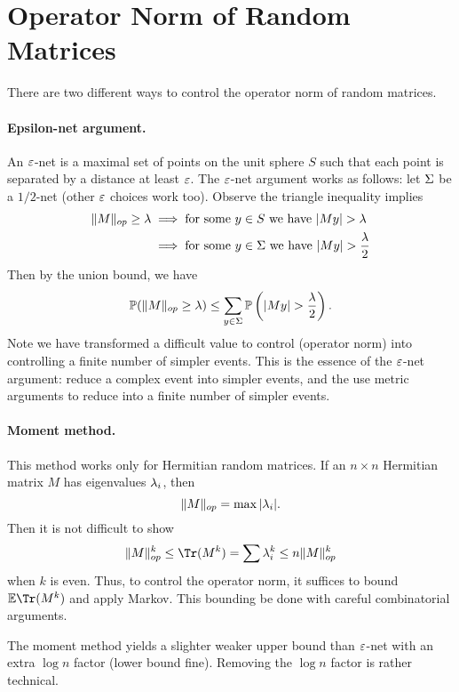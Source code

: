 \section*{Operator Norm of Random Matrices}

There are two different ways to control the operator norm of random matrices.

\paragraph{Epsilon-net argument.} An $\e$-net is a maximal set of points on the unit sphere $S$ such that each point is separated by a distance at least $\e$. The $\e$-net argument works as follows: let $\S$ be a $1/2$-net (other $\e$ choices work too). Observe the triangle inequality implies
\[
    \begin{split}
        \|M\|_{op} \ge \l & \implies \text{for some $y \in S$ we have } |My| > \l            \\
                          & \implies \text{for some $y \in \S$ we have } |My| > \frac{\l}{2} \\
    \end{split}
\]
Then by the union bound, we have
\[
    \bP(\|M\|_{op} \ge \l) \le \sum_{y \in \S} \bP\left(|My| > \frac{\l}{2}\right).
\]
Note we have transformed a difficult value to control (operator norm) into controlling a finite number of simpler events. This is the essence of the $\e$-net argument: reduce a complex event into simpler events, and the use metric arguments to reduce into a finite number of simpler events.

\paragraph{Moment method.} This method works only for Hermitian random matrices. If an $n \times n$ Hermitian matrix $M$ has eigenvalues $\l_i$, then
\[
    \|M\|_{op} = \max |\l_i|.
\]
Then it is not difficult to show
\[
    \|M\|^k_{op} \leq \Tr(M^k) = \sum \l_i^k \leq n\|M\|^k_{op}
\]
when $k$ is even. Thus, to control the operator norm, it suffices to bound $\bE \Tr(M^k)$ and apply Markov. This bounding be done with careful combinatorial arguments.

The moment method yields a slighter weaker upper bound than $\e$-net with an extra $\log n$ factor (lower bound fine). Removing the $\log n$ factor is rather technical.

